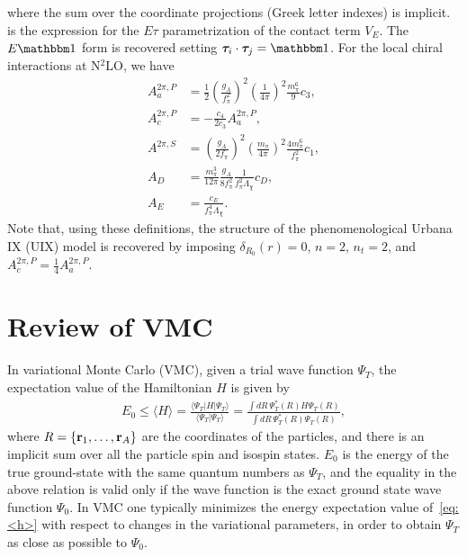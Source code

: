\documentclass[aps,prc,twocolumn,superscriptaddress,floatfix]{revtex4-1}
\begin{document}
where the sum over the coordinate projections (Greek letter indexes) is implicit.
 is the expression for the $E\tau$ parametrization of the contact term $V_E$.
The $E\mathbbm1$ form is recovered setting $\bm{\tau}_i\cdot\bm{\tau}_j=\mathbbm1$.
For the local chiral interactions at N$^2$LO, we have
\begin{align}
A_a^{2\pi,P}&=\frac{1}{2}\left(\frac{g_A}{f_\pi^2}\right)^2\left(\frac{1}{4\pi}\right)^2
\frac{m_\pi^6}{9}c_3 \nonumber, \\
A_c^{2\pi,P}&=-\frac{c_4}{2c_3}A_a^{2\pi,P} \nonumber, \\
A^{2\pi,S}&=\left(\frac{g_A}{2f_\pi}\right)^2\left(\frac{m_\pi}{4\pi}\right)^2\frac{4m_\pi^6}{f_\pi^2}c_1
\nonumber, \\
A_D&=\frac{m_\pi^3}{12\pi}\frac{g_A}{8f_\pi^2}\frac{1}{f_\pi^2\Lambda_\chi}c_D
\nonumber, \\
A_E&=\frac{c_E}{f_\pi^4\Lambda_\chi}.
\end{align}
Note that, using these definitions, the structure of the phenomenological Urbana IX (UIX) model
is recovered by imposing $\delta_{R_0}(r)=0$, $n=2$, $n_t=2$, and $A_c^{2\pi,P}=\frac{1}{4}A_a^{2\pi,P}$.


\section{Review of VMC}
\label{sec:vmc}
In variational Monte Carlo (VMC), given a trial wave function $\Psi_T$,
the expectation value of the Hamiltonian $H$ is given by
\begin{align}
\!\!\!E_0\leq\langle H\rangle=\frac{\langle\Psi_T|H|\Psi_T\rangle}{\langle\Psi_T|\Psi_T\rangle}
=\frac{\displaystyle\int\!dR\,\Psi_T^*(R)H\Psi_T(R)}
{\displaystyle\int\!dR\,\Psi_T^*(R)\Psi_T(R)} ,
\label{eq:<h>}
\end{align}
where $R=\{\vb{r}_1,\dots,\vb{r}_A\}$ are the coordinates of the particles, and there is an 
implicit sum over all the particle spin and isospin states. 
$E_0$ is the energy of the true ground-state with the same quantum numbers as $\Psi_T$, 
and the equality in the above relation is valid only if the wave function is the exact
ground state wave function $\Psi_0$. In VMC one typically minimizes the energy expectation 
value of~\cref{eq:<h>} with respect to changes in the variational parameters, in order to 
obtain $\Psi_T$ as close as possible to $\Psi_0$. 
\end{document}
